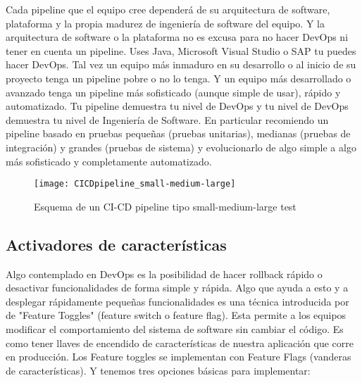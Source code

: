 Cada pipeline que el equipo cree dependerá de su arquitectura de software, plataforma y la propia madurez de ingeniería de software del equipo. Y la arquitectura de software o la plataforma no es excusa para no hacer DevOps ni tener en cuenta un pipeline. Uses Java, Microsoft Visual Studio o SAP tu puedes hacer DevOps. Tal vez un  equipo más inmaduro en su desarrollo o al inicio de su proyecto tenga un pipeline pobre o no lo tenga. Y un equipo más desarrollado o avanzado tenga un pipeline más sofisticado (aunque simple de usar), rápido y automatizado. Tu pipeline demuestra tu nivel de DevOps y tu nivel de DevOps demuestra tu nivel de Ingeniería de Software. En particular recomiendo un pipeline basado en pruebas pequeñas (pruebas unitarias), medianas (pruebas de integración) y grandes (pruebas de sistema) y evolucionarlo de algo simple a algo más sofisticado y completamente automatizado. 

\begin{figure}[h]
  \centering
  \texttt{[image: CICDpipeline\_small-medium-large]}
  \caption{Esquema de un CI-CD pipeline tipo small-medium-large test}
  \centering
  \label{fig:CICDpipeline_small-medium-large} %
\end{figure}
\FloatBarrier %

\subsection{Activadores de características}

Algo contemplado en DevOps es la posibilidad de hacer rollback rápido o desactivar funcionalidades de forma simple y rápida. Algo que ayuda a esto y a desplegar rápidamente pequeñas funcionalidades es una técnica introducida por de "Feature Toggles" (feature switch o feature flag). Esta permite a los equipos modificar el comportamiento del sistema de software sin cambiar el código. Es como tener llaves de encendido de características de nuestra aplicación que corre en producción. Los Feature toggles se implementan con Feature Flags (vanderas de características). Y tenemos tres opciones básicas para implementar:

